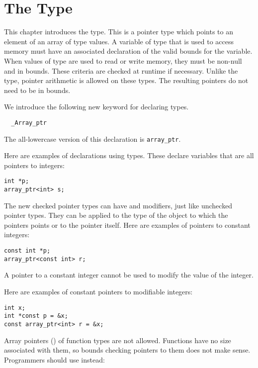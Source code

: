 
\chapter{The \arrayptrT Type}
\label{chapter:array-ptrs}

This chapter introduces the \arrayptrT type. This is a pointer
type which points to an element of an array of type  values.
A variable of type \arrayptrT that is used to access memory must have an
associated declaration of the valid bounds for the variable. When values
of type \arrayptrT are used to read or write memory, they must be non-null
and in bounds. These criteria are checked at runtime if necessary. Unlike
the \ptrT type, pointer arithmetic is allowed on these types. The resulting
pointers do not need to be in bounds.

We introduce the following new keyword for declaring \arrayptrT types.

\begin{lstlisting}
  _Array_ptr
\end{lstlisting}

The all-lowercase version of this declaration is \lstinline{array_ptr}.

Here are  examples of declarations using \arrayptrT types. These declare variables that
are all pointers to integers:
\begin{lstlisting}
int *p;
array_ptr<int> s;
\end{lstlisting}

The new checked pointer types can have  and 
modifiers, just like unchecked pointer types.   They can be applied to the type
of the object to which the pointers points or to the pointer itself.  Here are examples
of pointers to constant integers:

\begin{lstlisting}
const int *p;
array_ptr<const int> r;
\end{lstlisting}

A pointer to a constant integer cannot be used to modify the value of
the integer.

Here are examples of constant pointers to modifiable integers:

\begin{lstlisting}
int x;
int *const p = &x;
const array_ptr<int> r = &x;
\end{lstlisting}

Array pointers (\arrayptrT) of function types are not allowed. Functions have
no size associated with them, so bounds checking pointers to them does not
make sense.  Programmers should use \ptrT instead:


